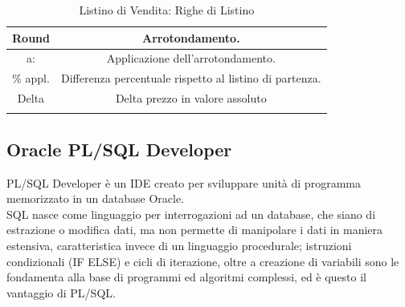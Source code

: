 \begin{longtable}{| c | c |}
	Round & Arrotondamento.\\ \hline    

	a: & Applicazione dell'arrotondamento.\\ \hline    

	\% appl. & Differenza percentuale rispetto al listino di partenza.\\ \hline    

	Delta & Delta prezzo in valore assoluto \\ \hline
	\caption{Listino di Vendita: Righe di Listino}

\end{longtable}
\subsection{Oracle PL/SQL Developer}
PL/SQL Developer è un IDE creato per sviluppare unità di programma memorizzato in un database Oracle.\\
SQL nasce come linguaggio per interrogazioni ad un database, che siano di estrazione o modifica dati, ma non permette di manipolare i dati in maniera estensiva, caratteristica invece di un linguaggio procedurale; istruzioni condizionali (IF ELSE) e cicli di iterazione, oltre a creazione di variabili sono le fondamenta alla base di programmi ed algoritmi complessi, ed è questo il vantaggio di PL/SQL.\\
